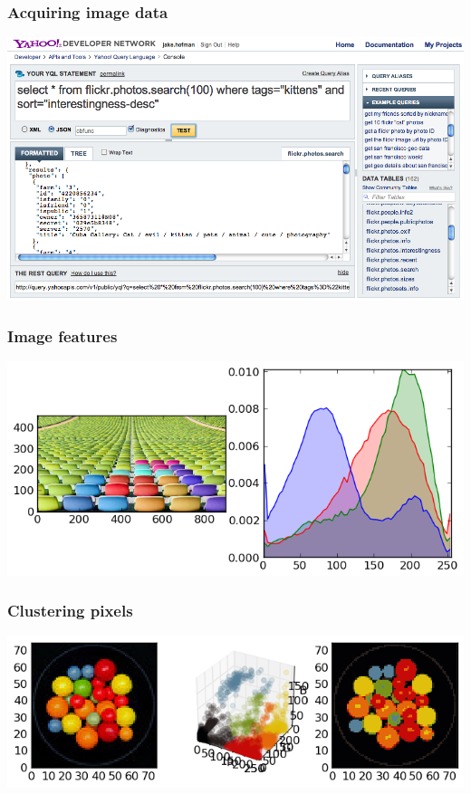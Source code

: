 \begin{frame}
  \frametitle{Acquiring image data}

  \begin{center}
  \includegraphics[width=\textwidth]{yql_console.png}
  \end{center}

\end{frame}


\begin{frame}
  \frametitle{Image features}

  \begin{center}
  \includegraphics[width=\textwidth]{../../code/image_data/chairs_64.png}
  \end{center}

\end{frame}


\begin{frame}
  \frametitle{Clustering pixels}

  \begin{center}
  \includegraphics[width=\textwidth]{../../code/image_data/candy_clustered.png}
  \end{center}

\end{frame}


